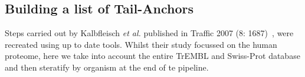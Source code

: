 
\subsection{Building a list of Tail-Anchors}
Steps carried out by Kalbfleisch \textit{et al.} published in Traffic 2007 (8: 1687)~\cite{Kalbfleisch2007}, were recreated using up to date tools. Whilst their study focussed on the human proteome, here we take into account the entire TrEMBL and Swiss-Prot database and then steratify by organism at the end of te pipeline.

